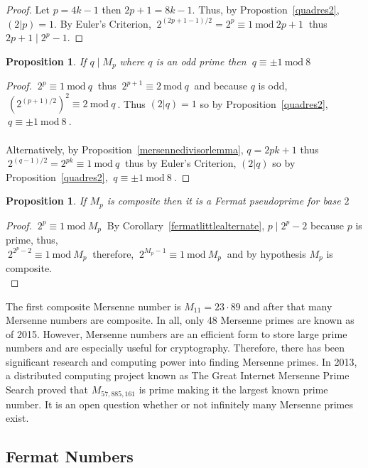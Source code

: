 \documentclass[12pt]{extarticle}
\renewcommand\qedsymbol{$\square$}
\newcommand{\divides}{\mid}
\newtheorem{proposition}[theorem]{Proposition}
\newenvironment{lproof}{\begin{proof} \renewcommand{\qedsymbol}{}}{\end{proof}}
\renewcommand{\mod}[3]{\: #1 \equiv #2 \: \mathrm{mod} \: #3 \:}
\begin{document}
\begin{lproof}
Let $p = 4k - 1$ then $2p + 1 = 8k - 1$. Thus, by Propostion~\ref{quadres2}, $(2|p) = 1$. By Euler's Criterion, $\mod{2^{(2p+1-1)/2} = 2^p}{1}{2p + 1}$ thus $2p + 1 \divides 2^p - 1$.
\end{lproof}

\begin{proposition}
If $q \divides M_p$ where $q$ is an odd prime then $\mod{q}{\pm 1}{8}$
\end{proposition}

\begin{lproof}
$\mod{2^p}{1}{q}$ thus $\mod{2^{p+1}}{2}{q}$ and because $q$ is odd, $\mod{(2^{(p+1)/2})^2}{2}{q}$. Thus $(2|q) = 1$ so by Proposition~\ref{quadres2}, $\mod{q}{\pm 1}{8}$.\\\\
Alternatively, by Proposition~\ref{mersennedivisorlemma}, $q = 2pk + 1$ thus $\mod{2^{(q-1)/2} = 2^{pk}}{1}{q}$ thus by Euler's Criterion, $(2|q)$ so by Proposition~\ref{quadres2}, $\mod{q}{\pm 1}{8}$.
\end{lproof}

\begin{proposition}
If $M_p$ is composite then it is a Fermat pseudoprime for base $2$    
\end{proposition}

\begin{lproof}
$\mod{2^p}{1}{M_p}$ By Corollary~\ref{fermatlittlealternate}, $p \divides 2^p - 2$ because $p$ is prime, thus,  \\ $\mod{2^{2^p- 2}}{1}{M_p}$ therefore, $\mod{2^{M_p - 1}}{1}{M_p}$ and by hypothesis $M_p$ is composite. \\
\end{lproof}

\noindent The first composite Mersenne number is $M_{11} = 23 \cdot 89$ and after that many Mersenne numbers are composite. In all, only 48 Mersenne primes are known as of 2015. However, Mersenne numbers are an efficient form to store large prime numbers and are especially useful for cryptography. Therefore, there has been significant research and computing power into finding Mersenne primes. In 2013, a distributed computing project known as The Great Internet Mersenne Prime Search proved that $M_{57,885,161}$ is prime making it the largest known prime number. It is an open question whether or not infinitely many Mersenne primes exist.


\newpage

\subsection{Fermat Numbers}
\end{document}
